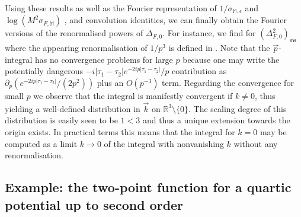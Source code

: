 \documentclass[10pt]{book}
\newcommand{\ms}{\mathsf{ms}}
\let\int\int
\theoremstyle{break}
\begin{document}
Using these results as well as the Fourier representation of $1/\sigma_{\mathbb{M},\epsilon}$ %
and $\log \left(M^2\sigma_{F,\mathbb{M}}\right)$
, and convolution identities, we can finally obtain the Fourier versions of the renormalised powers of $\Delta_{F,0}$. For instance, we find for $\left(\Delta^2_{F,0}\right)_\ms$
%
%
where the appearing renormalisation of $1/p^3$ is defined in %
. Note that the $\vec{p}$-integral has no convergence problems for large $p$ because one may write the potentially dangerous $-i|\tau_1-\tau_2|e^{-2ip|\tau_1-\tau_2|}/p$ contribution as $\partial_p( e^{-2ip|\tau_1-\tau_2|}/(2p^2))$ plus an $O(p^{-3})$ term. Regarding the convergence for small $p$ we observe that the integral is manifestly convergent if $k\neq0$, thus yielding a well-defined distribution in $\vec{k}$ on $\mathbb{R}^3\setminus\{0\}$. The scaling degree of this distribution is easily seen to be $1<3$ and thus a unique extension towards the origin exists. In practical terms this means that the integral for $k=0$ may be computed as a limit $k\to0$ of the integral with nonvanishing $k$ without any renormalisation. 


\subsection{Example: the two-point function for a quartic potential up to second order}
\end{document}
